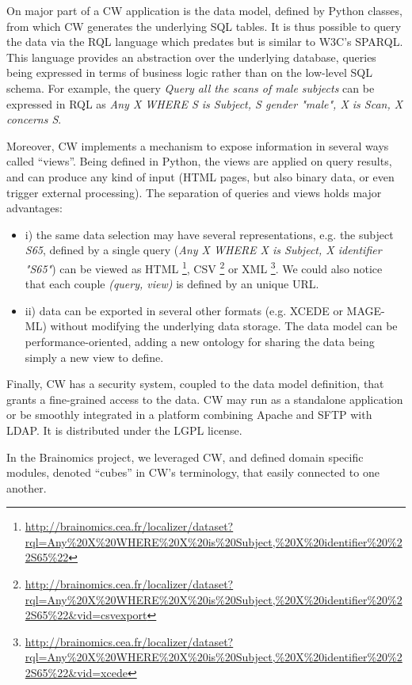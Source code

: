 \documentclass[review]{elsarticle}
\begin{document}
On major part of a CW application is the data model, defined by Python classes, from which CW generates the underlying SQL tables. It is thus possible to query the data via the RQL language which predates but is similar to W3C's SPARQL. This language provides an abstraction over the underlying database, queries being expressed in terms of business logic rather than on the low-level SQL schema. For example, the query \emph{Query all the scans of male subjects} can be expressed in RQL as \emph{Any X WHERE S is Subject, S gender "male", X is Scan, X concerns S}.


Moreover, CW implements a mechanism to expose information in several ways called ``views''. Being defined in Python, the views are applied on query results, and can produce any kind of input (HTML pages, but also binary data, or even trigger external processing). The separation of queries and views holds major advantages:
\begin{itemize}
\item i) the same data selection may have several representations, e.g. the subject \emph{S65}, defined by a single query (\emph{Any X WHERE X is Subject, X identifier "S65"}) can be viewed as HTML \footnote{\url{http://brainomics.cea.fr/localizer/dataset?rql=Any\%20X\%20WHERE\%20X\%20is\%20Subject,\%20X\%20identifier\%20\%22S65\%22}}, CSV \footnote{\url{http://brainomics.cea.fr/localizer/dataset?rql=Any\%20X\%20WHERE\%20X\%20is\%20Subject,\%20X\%20identifier\%20\%22S65\%22&vid=csvexport}} or XML \footnote{\url{http://brainomics.cea.fr/localizer/dataset?rql=Any\%20X\%20WHERE\%20X\%20is\%20Subject,\%20X\%20identifier\%20\%22S65\%22&vid=xcede}}. We could also notice that each couple \emph{(query, view)} is defined by an unique URL.
\item ii) data can be exported in several other formats (e.g. XCEDE or MAGE-ML) without modifying the underlying data storage. The data model can be performance-oriented, adding a new ontology for sharing the data being simply a new view to define.
\end{itemize}
Finally, CW has a security system, coupled to the data model definition, that grants a fine-grained access to the data. CW may run as a standalone application or be smoothly integrated in a platform combining Apache and SFTP with LDAP. It is distributed under the LGPL license.

In the Brainomics project, we leveraged CW, and defined domain specific modules, denoted ``cubes'' in CW's terminology, that easily connected to one another.
\end{document}
